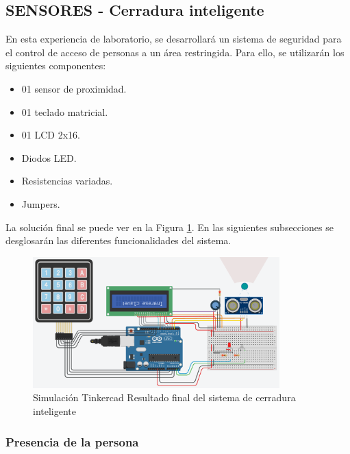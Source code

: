 \documentclass{article}
\begin{document}

\subsection{SENSORES - Cerradura inteligente}

En esta experiencia de laboratorio, se desarrollará un sistema de seguridad para el control de acceso de personas a un área restringida. Para ello, se utilizarán los siguientes componentes: 

\begin{itemize}
    \item 01 sensor de proximidad.
    \item 01 teclado matricial.
    \item 01 LCD 2x16.
    \item Diodos LED.
    \item Resistencias variadas.
    \item Jumpers.
\end{itemize}

La solución final se puede ver en la Figura \ref{fig:cerradura_smart}. En las siguientes subsecciones se desglosarán las diferentes funcionalidades del sistema.

\begin{figure}[H]
    \centering
    \includegraphics[width=0.85\textwidth]{./img/ckpt_6.png}
    \caption{Simulación Tinkercad Resultado final del sistema de cerradura inteligente}
    \label{fig:cerradura_smart}
\end{figure}


\subsubsection{Presencia de la persona}
\end{document}

